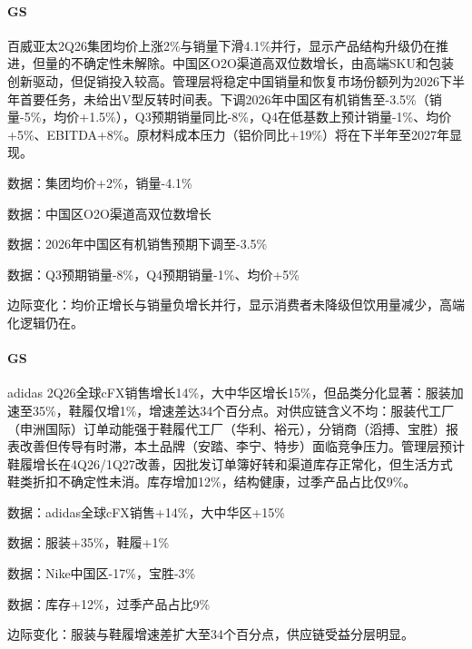 \documentclass[11pt]{ctexart}
\begin{document}
\paragraph{GS} 百威亚太2Q26集团均价上涨2\%与销量下滑4.1\%并行，显示产品结构升级仍在推进，但量的不确定性未解除。中国区O2O渠道高双位数增长，由高端SKU和包装创新驱动，但促销投入较高。管理层将稳定中国销量和恢复市场份额列为2026下半年首要任务，未给出V型反转时间表。下调2026年中国区有机销售至-3.5\%（销量-5\%，均价+1.5\%），Q3预期销量同比-8\%，Q4在低基数上预计销量-1\%、均价+5\%、EBITDA+8\%。原材料成本压力（铝价同比+19\%）将在下半年至2027年显现。
{\small\color{refgray}数据：集团均价+2\%，销量-4.1\%\par}
{\small\color{refgray}数据：中国区O2O渠道高双位数增长\par}
{\small\color{refgray}数据：2026年中国区有机销售预期下调至-3.5\%\par}
{\small\color{refgray}数据：Q3预期销量-8\%，Q4预期销量-1\%、均价+5\%\par}
{\small\color{refgray}边际变化：均价正增长与销量负增长并行，显示消费者未降级但饮用量减少，高端化逻辑仍在。\par}
\paragraph{GS} adidas 2Q26全球cFX销售增长14\%，大中华区增长15\%，但品类分化显著：服装加速至35\%，鞋履仅增1\%，增速差达34个百分点。对供应链含义不均：服装代工厂（申洲国际）订单动能强于鞋履代工厂（华利、裕元），分销商（滔搏、宝胜）报表改善但传导有时滞，本土品牌（安踏、李宁、特步）面临竞争压力。管理层预计鞋履增长在4Q26/1Q27改善，因批发订单簿好转和渠道库存正常化，但生活方式鞋类折扣不确定性未消。库存增加12\%，结构健康，过季产品占比仅9\%。
{\small\color{refgray}数据：adidas全球cFX销售+14\%，大中华区+15\%\par}
{\small\color{refgray}数据：服装+35\%，鞋履+1\%\par}
{\small\color{refgray}数据：Nike中国区-17\%，宝胜-3\%\par}
{\small\color{refgray}数据：库存+12\%，过季产品占比9\%\par}
{\small\color{refgray}边际变化：服装与鞋履增速差扩大至34个百分点，供应链受益分层明显。\par}
\end{document}
